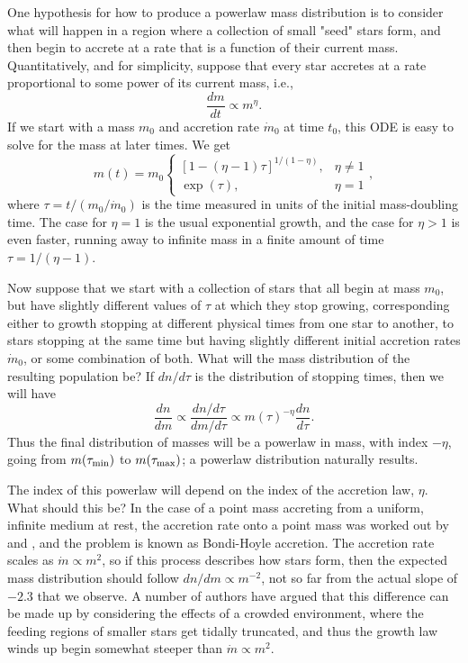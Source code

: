 One hypothesis for how to produce a powerlaw mass distribution is to consider what will happen in a region where a collection of small "seed" stars form, and then begin to accrete at a rate that is a function of their current mass. Quantitatively, and for simplicity, suppose that every star accretes at a rate proportional to some power of its current mass, i.e.,
\begin{equation}
\frac{dm}{dt} \propto m^\eta.
\end{equation}
If we start with a mass $m_0$ and accretion rate $\dot{m}_0$ at time $t_0$, this ODE is easy to solve for the mass at later times. We get
\begin{equation}
m(t) = m_0 \left\{
\begin{array}{ll}
[1 - (\eta-1)\tau]^{1/(1-\eta)}, & \eta \neq 1 \\
\exp(\tau), & \eta = 1
\end{array}
\right.,
\end{equation}
where $\tau = t / (m_0/\dot{m}_0)$ is the time measured in units of the initial mass-doubling time. The case for $\eta = 1$ is the usual exponential growth, and the case for $\eta > 1$ is even faster, running away to infinite mass in a finite amount of time $\tau = 1/(\eta-1)$.

Now suppose that we start with a collection of stars that all begin at mass $m_0$, but have slightly different values of $\tau$ at which they stop growing, corresponding either to growth stopping at different physical times from one star to another, to stars stopping at the same time but having slightly different initial accretion rates $\dot{m}_0$, or some combination of both. What will the mass distribution of the resulting population be? If $dn/d\tau$ is the distribution of stopping times, then we will have
\begin{equation}
\frac{dn}{dm} \propto \frac{dn/d\tau}{dm/d\tau} \propto m(\tau)^{-\eta} \frac{dn}{d\tau}.
\end{equation}
Thus the final distribution of masses will be a powerlaw in mass, with index $-\eta$, going from $m(\tau_{\rm min})$ to $m(\tau_{\rm max})$; a powerlaw distribution naturally results.

The index of this powerlaw will depend on the index of the accretion law, $\eta$. What should this be? In the case of a point mass accreting from a uniform, infinite medium at rest, the accretion rate onto a point mass was worked out by \citet{hoyle46a} and \citet{bondi52a}, and the problem is known as Bondi-Hoyle accretion. The accretion rate scales as $\dot{m} \propto m^2$, so if this process describes how stars form, then the expected mass distribution should follow $dn/dm\propto m^{-2}$, not so far from the actual slope of $-2.3$ that we observe. A number of authors have argued that this difference can be made up by considering the effects of a crowded environment, where the feeding regions of smaller stars get tidally truncated, and thus the growth law winds up begin somewhat steeper than $\dot{m}\propto m^2$.

